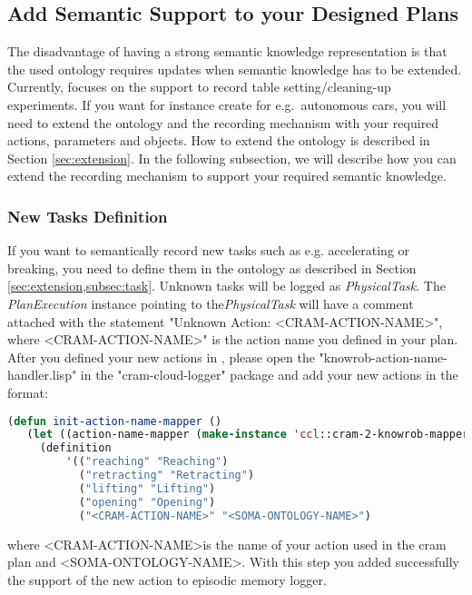 \subsection{Add Semantic Support to your Designed Plans}
The disadvantage of having a strong semantic knowledge representation is that the used ontology requires updates when semantic knowledge has to be extended. 
Currently, \soma focuses on the support to record table setting/cleaning-up experiments.
If you want for instance create \neems for e.g.\ autonomous cars, you will need to extend the \soma ontology and the recording mechanism with your required actions, parameters and objects.
How to extend the \soma ontology is described in Section \ref{sec:extension}.
In the following subsection, we will describe how you can extend the \cram recording mechanism to support your required semantic knowledge.

\subsubsection{New Tasks Definition}
If you want to semantically record new tasks such as e.g. accelerating or breaking, you need to define them in the ontology as described in Section \ref{sec:extension,subsec:task}.
Unknown tasks will be logged as \textit{PhysicalTask}.
The \textit{PlanExecution} instance pointing to the\textit{PhysicalTask} will have a comment attached with the statement "Unknown Action: \textless CRAM-ACTION-NAME\textgreater", where \textless CRAM-ACTION-NAME\textgreater" is the action name you defined in your plan.
After you defined your new actions in \soma, please open the "knowrob-action-name-handler.lisp" in the "cram-cloud-logger" package and add your new actions in the format:

\begin{lstlisting}[language=lisp, caption=Linking the CRAM Action to the Ontology Concept]
(defun init-action-name-mapper ()
   (let ((action-name-mapper (make-instance 'ccl::cram-2-knowrob-mapper))
     (definition
         '(("reaching" "Reaching")
           ("retracting" "Retracting")
           ("lifting" "Lifting")
           ("opening" "Opening")
           ("<CRAM-ACTION-NAME>" "<SOMA-ONTOLOGY-NAME>")
\end{lstlisting}

where \textless CRAM-ACTION-NAME\textgreater is the name of your action used in the cram plan and \textless SOMA-ONTOLOGY-NAME\textgreater.
With this step you added successfully the support of the new action to \cram \neem episodic memory logger.

